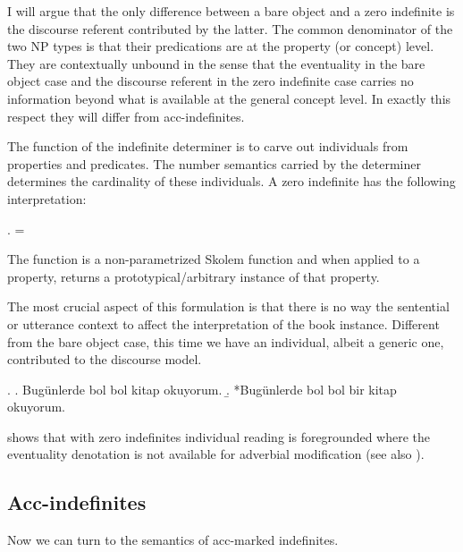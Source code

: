 \documentclass[11pt,a4paper]{article}
\begin{document}
I will argue that the only difference between a bare object and a zero indefinite is the discourse referent contributed by the latter. The common denominator of the two NP types is that their predications are at the property (or concept) level. They are contextually unbound in the sense that the eventuality in the bare object case and the discourse referent in the zero indefinite case carries no information beyond what is available at the general concept level. In exactly this respect they will differ from acc-indefinites.


The function of the indefinite determiner is to carve out individuals from properties and predicates. The number semantics carried by the determiner determines the cardinality of these individuals. A zero indefinite has the following interpretation:

\ex.
 =

The function  is a non-parametrized Skolem function and when applied to a property, returns a prototypical/arbitrary instance of that property.

The most crucial aspect of this formulation is that there is no way the sentential or utterance context to affect the interpretation of the book instance. Different from the bare object case, this time we have an individual, albeit a generic one, contributed to the discourse model.

\ex.\label{exbolbol}
\a. Bugünlerde bol bol kitap okuyorum.
\b. *Bugünlerde bol bol bir kitap okuyorum.

 shows that with zero indefinites individual reading is foregrounded where the eventuality denotation is not available for adverbial modification (see also ).



\subsection{Acc-indefinites}


Now we can turn to the semantics of acc-marked indefinites.
\end{document}
